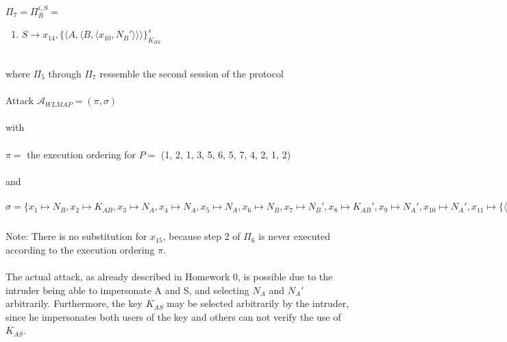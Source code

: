 \documentclass[12pt,pdftex,a4paper]{article}
\newcommand\tab[1][1cm]{\hspace*{#1}}
\begin{document}
$\Pi_7 = \Pi_B^{i,S} =$
\begin{enumerate}
\item \tab $ S \rightarrow x_{14}, \{\langle A, \langle B, \langle x_{10}, N_B' \rangle\rangle\rangle\}_{K_{BS}}^s $
\end{enumerate}\
\\
where $\Pi_5$ through $\Pi_7$ ressemble the second session of the protocol\\~\\
Attack $\mathcal{A}_{WLMAP} = (\pi, \sigma) $ \\~\\
with\\~\\
$\pi = $ the execution ordering for $ P =$ (1, 2, 1, 3, 5, 6, 5, 7, 4, 2, 1, 2) \\~\\
and \\~\\
$\sigma = \{	
				x_1 \mapsto N_B, 
				x_2 \mapsto K_{AB}, 
				x_3 \mapsto N_A,
				x_4 \mapsto N_A,
				x_5 \mapsto N_A,
				x_6 \mapsto N_B,
				x_7 \mapsto N_B',
				x_8 \mapsto K_{AB}',
				x_9 \mapsto N_A',
				x_{10} \mapsto N_A',
				x_{11} \mapsto \{\langle A, \langle B, \langle N_A, N_B\rangle\rangle\rangle\}_{K_{AS}}^s,
				x_{12} \mapsto \{\langle B, \langle N_A, \langle N_B, K_{AB}\rangle\rangle\rangle\}_{K_{AS}}^s,
				x_{14} \mapsto \{\langle A, \langle B, \langle N_A', N_B'\rangle\rangle\rangle\}_{K_{AS}}^s
\}$\\~\\
Note: There is no substitution for $x_{15}$, because step 2 of $\Pi_6$ is never executed according to the execution ordering $\pi$.
\\~\\
The actual attack, as already described in Homework 0, is possible due to the intruder being able to impersonate A and S, and selecting $N_A$ and $N_A'$ arbitrarily. Furthermore, the key $K_{AS}$ may be selected arbitrarily by the intruder, since he impersonates both users of the key and others can not verify the use of $K_{AS}$.
\end{document}
